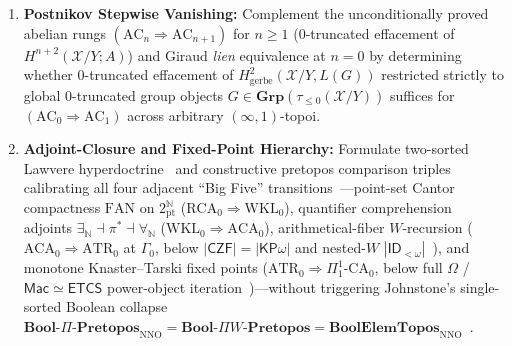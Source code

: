 \documentclass[10pt,twoside,openright]{book}
\theoremstyle{crmplain}
\theoremstyle{crmdef}
\theoremstyle{crmremark}
\begin{document}
\begin{enumerate}[label=\textbf{\arabic*.},leftmargin=1.8em]
  \item \textbf{Postnikov Stepwise Vanishing:} Complement the unconditionally proved abelian rungs $(\mathrm{AC}_n \Rightarrow \mathrm{AC}_{n+1})$ for $n \ge 1$ ($0$-truncated effacement of $H^{n+2}(\mathcal{X}/Y; A)$) and Giraud \emph{lien} equivalence at $n = 0$ by determining whether $0$-truncated effacement of $H^2_{\mathrm{gerbe}}(\mathcal{X}/Y, L(G))$ restricted strictly to global $0$-truncated group objects $G \in \mathbf{Grp}(\tau_{\le 0}(\mathcal{X}/Y))$ suffices for $(\mathrm{AC}_0 \Rightarrow \mathrm{AC}_1)$ across arbitrary $(\infty, 1)$-topoi.

  \item \textbf{Adjoint-Closure and Fixed-Point Hierarchy:} Formulate two-sorted Lawvere hyperdoctrine~\cite{Lawvere69} and constructive pretopos comparison triples calibrating all four adjacent ``Big Five'' transitions~\cite{Friedman75,Simpson09}---point-set Cantor compactness $\mathrm{FAN}$ on $2^{\mathbb{N}}_{\mathrm{pt}}$ ($\mathrm{RCA}_0 \Rightarrow \mathrm{WKL}_0$), quantifier comprehension adjoints $\exists_{\mathbb{N}} \dashv \pi^* \dashv \forall_{\mathbb{N}}$ ($\mathrm{WKL}_0 \Rightarrow \mathrm{ACA}_0$), arithmetical-fiber $W$-recursion ($\mathrm{ACA}_0 \Rightarrow \mathrm{ATR}_0$ at $\Gamma_0$, below $|\mathsf{CZF}| = |\mathsf{KP}\omega|$ and nested-$W$ $|\mathsf{ID}_{<\omega}|$~\cite{Aczel78}), and monotone Knaster--Tarski fixed points ($\mathrm{ATR}_0 \Rightarrow \Pi^1_1\text{-}\mathrm{CA}_0$, below full $\Omega$ / $\mathsf{Mac} \simeq \mathsf{ETCS}$ power-object iteration~\cite{Cole73,Maietti05})---without triggering Johnstone's single-sorted Boolean collapse $\mathbf{Bool}\text{-}\Pi\text{-}\mathbf{Pretopos}_{\mathrm{NNO}} = \mathbf{Bool}\text{-}\Pi W\text{-}\mathbf{Pretopos} = \mathbf{BoolElemTopos}_{\mathrm{NNO}}$~\cite[\S A2.1]{Johnstone02}.

\end{enumerate}
\end{document}
